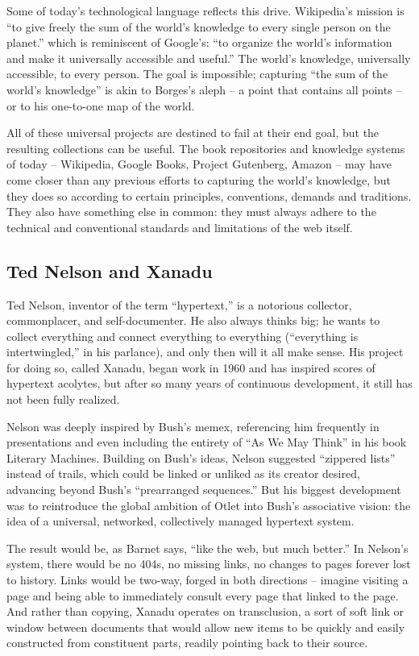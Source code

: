 Some of today’s technological language reflects this drive. Wikipedia’s mission is “to give freely the sum of the world’s knowledge to every single person on the planet.”  which is reminiscent of Google’s: “to organize the world's information and make it universally accessible and useful.”  The world’s knowledge, universally accessible, to every person. The goal is impossible; capturing “the sum of the world’s knowledge” is akin to Borges’s aleph – a point that contains all points – or to his one-to-one map of the world. 

All of these universal projects are destined to fail at their end goal, but the resulting collections can be useful. The book repositories and knowledge systems of today – Wikipedia, Google Books, Project Gutenberg, Amazon – may have come closer than any previous efforts to capturing the world’s knowledge, but they does so according to certain principles, conventions, demands and traditions. They also have something else in common: they must always adhere to the technical and conventional standards and limitations of the web itself. 

\subsection{Ted Nelson and Xanadu}

Ted Nelson, inventor of the term “hypertext,” is a notorious collector, commonplacer, and self-documenter. He also always thinks big; he wants to collect everything and connect everything to everything (“everything is intertwingled,” in his parlance), and only then will it all make sense. His project for doing so, called Xanadu, began work in 1960 and has inspired scores of hypertext acolytes, but after so many years of continuous development, it still has not been fully realized.

Nelson was deeply inspired by Bush’s memex, referencing him frequently in presentations and even including the entirety of “As We May Think” in his book Literary Machines. Building on Bush’s ideas, Nelson suggested “zippered lists” instead of trails, which could be linked or unliked as its creator desired, advancing beyond Bush’s “prearranged sequences.”  But his biggest development was to reintroduce the global ambition of Otlet into Bush’s associative vision: the idea of a universal, networked, collectively managed hypertext system.

The result would be, as Barnet says, “like the web, but much better.”  In Nelson’s system, there would be no 404s, no missing links, no changes to pages forever lost to history. Links would be two-way, forged in both directions – imagine visiting a page and being able to immediately consult every page that linked to the page. And rather than copying, Xanadu operates on transclusion, a sort of soft link or window between documents that would allow new items to be quickly and easily constructed from constituent parts, readily pointing back to their source.

